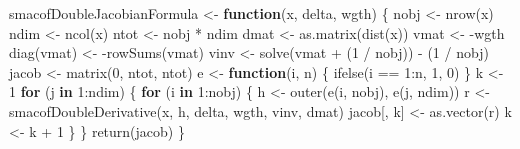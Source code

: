 \documentclass[
  12pt,
  letterpaper,
  DIV=11,
  numbers=noendperiod]{scrartcl}
\newenvironment{Shaded}{\begin{snugshade}}{\end{snugshade}}
\newcommand{\ControlFlowTok}[1]{\textcolor[rgb]{0.00,0.23,0.31}{\textbf{#1}}}
\newcommand{\DecValTok}[1]{\textcolor[rgb]{0.68,0.00,0.00}{#1}}
\newcommand{\FunctionTok}[1]{\textcolor[rgb]{0.28,0.35,0.67}{#1}}
\newcommand{\NormalTok}[1]{\textcolor[rgb]{0.00,0.23,0.31}{#1}}
\newcommand{\OtherTok}[1]{\textcolor[rgb]{0.00,0.23,0.31}{#1}}
\newcommand{\SpecialCharTok}[1]{\textcolor[rgb]{0.37,0.37,0.37}{#1}}
\begin{document}
\begin{Shaded}
\begin{Highlighting}[]
\NormalTok{smacofDoubleJacobianFormula }\OtherTok{\textless{}{-}} \ControlFlowTok{function}\NormalTok{(x, delta, wgth) \{}
\NormalTok{  nobj }\OtherTok{\textless{}{-}} \FunctionTok{nrow}\NormalTok{(x)}
\NormalTok{  ndim }\OtherTok{\textless{}{-}} \FunctionTok{ncol}\NormalTok{(x)}
\NormalTok{  ntot }\OtherTok{\textless{}{-}}\NormalTok{ nobj }\SpecialCharTok{*}\NormalTok{ ndim}
\NormalTok{  dmat }\OtherTok{\textless{}{-}} \FunctionTok{as.matrix}\NormalTok{(}\FunctionTok{dist}\NormalTok{(x))}
\NormalTok{  vmat }\OtherTok{\textless{}{-}} \SpecialCharTok{{-}}\NormalTok{wgth}
  \FunctionTok{diag}\NormalTok{(vmat) }\OtherTok{\textless{}{-}} \SpecialCharTok{{-}}\FunctionTok{rowSums}\NormalTok{(vmat)}
\NormalTok{  vinv }\OtherTok{\textless{}{-}} \FunctionTok{solve}\NormalTok{(vmat }\SpecialCharTok{+}\NormalTok{ (}\DecValTok{1} \SpecialCharTok{/}\NormalTok{ nobj)) }\SpecialCharTok{{-}}\NormalTok{ (}\DecValTok{1} \SpecialCharTok{/}\NormalTok{ nobj)}
\NormalTok{  jacob }\OtherTok{\textless{}{-}} \FunctionTok{matrix}\NormalTok{(}\DecValTok{0}\NormalTok{, ntot, ntot)}
\NormalTok{  e }\OtherTok{\textless{}{-}} \ControlFlowTok{function}\NormalTok{(i, n) \{}
    \FunctionTok{ifelse}\NormalTok{(i }\SpecialCharTok{==} \DecValTok{1}\SpecialCharTok{:}\NormalTok{n, }\DecValTok{1}\NormalTok{, }\DecValTok{0}\NormalTok{)}
\NormalTok{  \}}
\NormalTok{  k }\OtherTok{\textless{}{-}} \DecValTok{1}
  \ControlFlowTok{for}\NormalTok{ (j }\ControlFlowTok{in} \DecValTok{1}\SpecialCharTok{:}\NormalTok{ndim) \{}
    \ControlFlowTok{for}\NormalTok{ (i }\ControlFlowTok{in} \DecValTok{1}\SpecialCharTok{:}\NormalTok{nobj) \{}
\NormalTok{      h }\OtherTok{\textless{}{-}} \FunctionTok{outer}\NormalTok{(}\FunctionTok{e}\NormalTok{(i, nobj), }\FunctionTok{e}\NormalTok{(j, ndim))}
\NormalTok{      r }\OtherTok{\textless{}{-}} \FunctionTok{smacofDoubleDerivative}\NormalTok{(x, h, delta, wgth, vinv, dmat)}
\NormalTok{      jacob[, k] }\OtherTok{\textless{}{-}} \FunctionTok{as.vector}\NormalTok{(r)}
\NormalTok{      k }\OtherTok{\textless{}{-}}\NormalTok{ k }\SpecialCharTok{+} \DecValTok{1}
\NormalTok{    \}}
\NormalTok{  \}}
  \FunctionTok{return}\NormalTok{(jacob)}
\NormalTok{\}}


\end{Highlighting}
\end{Shaded}
\end{document}
